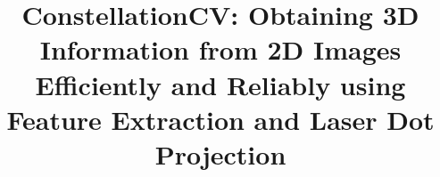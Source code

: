 \documentclass[preprint,12pt]{elsarticle}
\newenvironment{changemargin}[2]{%
\begin{list}{}{%
\setlength{\topsep}{0pt}%
\setlength{\leftmargin}{#1}%
\setlength{\rightmargin}{#2}%
\setlength{\listparindent}{\parindent}%
\setlength{\itemindent}{\parindent}%
\setlength{\parsep}{\parskip}%
}%
\item[]}{\end{list}}
\begin{document}
\begin{frontmatter}


\title{ConstellationCV: Obtaining 3D Information from 2D Images Efficiently and Reliably using Feature Extraction and Laser Dot Projection}




\author{}
\author{}

\address{Horace Mann School, Bronx, New York}

\begin{abstract}

\end{abstract}





\end{frontmatter}
\pagebreak

\tableofcontents


\end{document}
